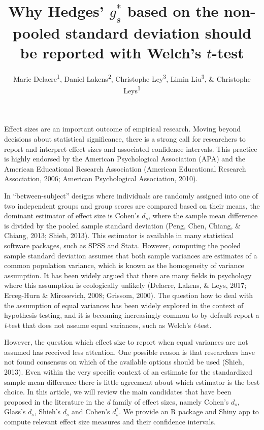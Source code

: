 \documentclass[
  english,
  man,floatsintext]{apa6}
\title{Why Hedges' \(g^*_s\) based on the non-pooled standard deviation should be reported with Welch's \(t\)-test}
\author{Marie Delacre\textsuperscript{1}, Daniel Lakens\textsuperscript{2}, Christophe Ley\textsuperscript{3}, Limin Liu\textsuperscript{3}, \& Christophe Leys\textsuperscript{1}}
\date{}
\affiliation{\vspace{0.5cm}\textsuperscript{1} Université Libre de Bruxelles, Service of Analysis of the Data (SAD), Bruxelles, Belgium\\\textsuperscript{2} Eindhoven University of Technology, Human Technology Interaction Group, Eindhoven, the Netherlands\\\textsuperscript{3} Universiteit Gent, Department of Applied Mathematics, Computer Science and Statistics, Gent, Belgium}
\begin{document}
\maketitle

Effect sizes are an important outcome of empirical research. Moving beyond decisions about statistical significance, there is a strong call for researchers to report and interpret effect sizes and associated confidence intervals. This practice is highly endorsed by the American Psychological Association (APA) and the American Educational Research Association (American Educational Research Association, 2006; American Psychological Association, 2010).

In \enquote{between-subject} designs where individuals are randomly assigned into one of two independent groups and group scores are compared based on their means, the dominant estimator of effect size is Cohen's \(d_s\), where the sample mean difference is divided by the pooled sample standard deviation (Peng, Chen, Chiang, \& Chiang, 2013; Shieh, 2013). This estimator is available in many statistical software packages, such as SPSS and Stata. However, computing the pooled sample standard deviation assumes that both sample variances are estimates of a common population variance, which is known as the homogeneity of variance assumption. It has been widely argued that there are many fields in psychology where this assumption is ecologically unlikely (Delacre, Lakens, \& Leys, 2017; Erceg-Hurn \& Mirosevich, 2008; Grissom, 2000). The question how to deal with the assumption of equal variances has been widely explored in the context of hypothesis testing, and it is becoming increasingly common to by default report a \emph{t}-test that does not assume equal variances, such as Welch's \emph{t}-test.

However, the question which effect size to report when equal variances are not assumed has received less attention. One possible reason is that researchers have not found consensus on which of the available options should be used (Shieh, 2013). Even within the very specific context of an estimate for the standardized sample mean difference there is little agreement about which estimator is the best choice. In this article, we will review the main candidates that have been proposed in the literature in the \emph{d} family of effect sizes, namely Cohen's \(d_s\), Glass's \(d_s\), Shieh's \(d_s\) and Cohen's \(d^*_s\). We provide an R package and Shiny app to compute relevant effect size measures and their confidence intervals.
\end{document}
